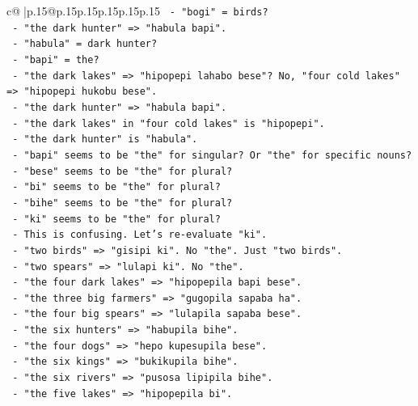 \documentclass{article}
\begin{document}
{\begin{supertabular}{c@{$\;$}|p{.15\linewidth}@{}p{.15\linewidth}p{.15\linewidth}p{.15\linewidth}p{.15\linewidth}p{.15\linewidth}}
{{{\texttt{             {-} "bogi" = birds?} \\
\texttt{           {-} "the dark hunter" => "habula bapi".} \\
\texttt{             {-} "habula" = dark hunter?} \\
\texttt{             {-} "bapi" = the?} \\
\texttt{           {-} "the dark lakes" => "hipopepi lahabo bese"? No, "four cold lakes" => "hipopepi hukobu bese".} \\
\texttt{           {-} "the dark hunter" => "habula bapi".} \\
\texttt{           {-} "the dark lakes" in "four cold lakes" is "hipopepi".} \\
\texttt{           {-} "the dark hunter" is "habula".} \\
\texttt{           {-} "bapi" seems to be "the" for singular? Or "the" for specific nouns?} \\
\texttt{           {-} "bese" seems to be "the" for plural?} \\
\texttt{           {-} "bi" seems to be "the" for plural?} \\
\texttt{           {-} "bihe" seems to be "the" for plural?} \\
\texttt{           {-} "ki" seems to be "the" for plural?} \\
\texttt{           {-} This is confusing. Let's re{-}evaluate "ki".} \\
\texttt{           {-} "two birds" => "gisipi ki". No "the". Just "two birds".} \\
\texttt{           {-} "two spears" => "lulapi ki". No "the".} \\
\texttt{           {-} "the four dark lakes" => "hipopepila bapi bese".} \\
\texttt{           {-} "the three big farmers" => "gugopila sapaba ha".} \\
\texttt{           {-} "the four big spears" => "lulapila sapaba bese".} \\
\texttt{           {-} "the six hunters" => "habupila bihe".} \\
\texttt{           {-} "the four dogs" => "hepo kupesupila bese".} \\
\texttt{           {-} "the six kings" => "bukikupila bihe".} \\
\texttt{           {-} "the six rivers" => "pusosa lipipila bihe".} \\
\texttt{           {-} "the five lakes" => "hipopepila bi".} \\
}}}
\end{supertabular}}
\end{document}
